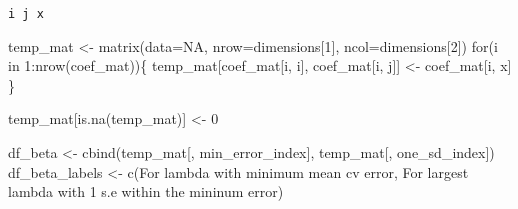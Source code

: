 \documentclass[
  letterpaper,
  DIV=11,
  numbers=noendperiod]{scrartcl}
\newenvironment{Shaded}{\begin{snugshade}}{\end{snugshade}}
\newcommand{\AttributeTok}[1]{\textcolor[rgb]{0.40,0.45,0.13}{#1}}
\newcommand{\ConstantTok}[1]{\textcolor[rgb]{0.56,0.35,0.01}{#1}}
\newcommand{\ControlFlowTok}[1]{\textcolor[rgb]{0.00,0.23,0.31}{#1}}
\newcommand{\DecValTok}[1]{\textcolor[rgb]{0.68,0.00,0.00}{#1}}
\newcommand{\FunctionTok}[1]{\textcolor[rgb]{0.28,0.35,0.67}{#1}}
\newcommand{\NormalTok}[1]{\textcolor[rgb]{0.00,0.23,0.31}{#1}}
\newcommand{\OtherTok}[1]{\textcolor[rgb]{0.00,0.23,0.31}{#1}}
\newcommand{\SpecialCharTok}[1]{\textcolor[rgb]{0.37,0.37,0.37}{#1}}
\newcommand{\StringTok}[1]{\textcolor[rgb]{0.13,0.47,0.30}{#1}}
\begin{document}
\begin{verbatim}
i j x
\end{verbatim}

\begin{Shaded}
\begin{Highlighting}[]
\NormalTok{temp\_mat }\OtherTok{\textless{}{-}} \FunctionTok{matrix}\NormalTok{(}\AttributeTok{data=}\ConstantTok{NA}\NormalTok{, }\AttributeTok{nrow=}\NormalTok{dimensions[}\DecValTok{1}\NormalTok{], }\AttributeTok{ncol=}\NormalTok{dimensions[}\DecValTok{2}\NormalTok{])}
\ControlFlowTok{for}\NormalTok{(i }\ControlFlowTok{in} \DecValTok{1}\SpecialCharTok{:}\FunctionTok{nrow}\NormalTok{(coef\_mat))\{}
\NormalTok{    temp\_mat[coef\_mat[i, }\StringTok{\textquotesingle{}i\textquotesingle{}}\NormalTok{], coef\_mat[i, }\StringTok{\textquotesingle{}j\textquotesingle{}}\NormalTok{]] }\OtherTok{\textless{}{-}}\NormalTok{ coef\_mat[i, }\StringTok{\textquotesingle{}x\textquotesingle{}}\NormalTok{]}
\NormalTok{\}}

\NormalTok{temp\_mat[}\FunctionTok{is.na}\NormalTok{(temp\_mat)] }\OtherTok{\textless{}{-}} \DecValTok{0}
\end{Highlighting}
\end{Shaded}

\begin{Shaded}
\begin{Highlighting}[]
\NormalTok{df\_beta }\OtherTok{\textless{}{-}} \FunctionTok{cbind}\NormalTok{(temp\_mat[, min\_error\_index], temp\_mat[, one\_sd\_index])}
\NormalTok{df\_beta\_labels }\OtherTok{\textless{}{-}} \FunctionTok{c}\NormalTok{(}\StringTok{\textquotesingle{}For lambda with minimum mean cv error\textquotesingle{}}\NormalTok{, }\StringTok{\textquotesingle{}For largest lambda with 1 s.e within the mininum error\textquotesingle{}}\NormalTok{)}
\end{Highlighting}
\end{Shaded}
\end{document}

